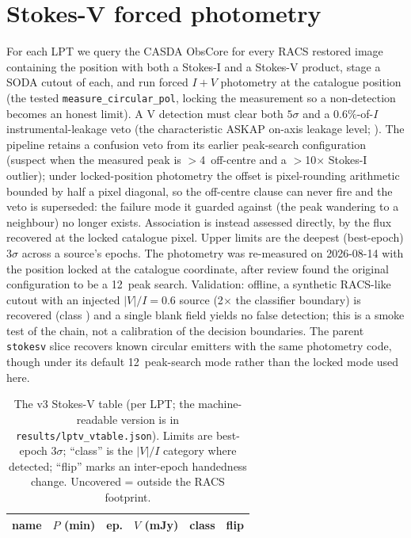 \documentclass[twocolumn]{aastex631}
\newcommand{\code}[1]{\texttt{#1}}
\begin{document}
\section{Stokes-V forced photometry}
\label{sec:v}
For each LPT we query the CASDA ObsCore for every RACS restored image containing the position with
both a Stokes-I and a Stokes-V product, stage a SODA cutout of each, and run forced $I{+}V$
photometry at the catalogue position (the tested \code{measure\_circular\_pol}, locking the
measurement so a non-detection becomes an honest limit). A V detection must clear both $5\sigma$
and a $0.6\%$-of-$I$ instrumental-leakage veto (the characteristic ASKAP on-axis leakage level;
\citealt{racslow2}). The pipeline retains a confusion veto from its earlier peak-search
configuration (suspect when the measured peak is $>$4\arcsec\ off-centre and a
$>$10$\times$ Stokes-I outlier); under locked-position photometry the offset is pixel-rounding
arithmetic bounded by half a pixel diagonal, so the off-centre clause can never fire and the veto
is superseded: the failure mode it guarded against (the peak wandering to a neighbour) no
longer exists. Association is instead assessed directly, by the flux recovered at the locked
catalogue pixel. Upper limits are the deepest (best-epoch) $3\sigma$ across a source's epochs.
The photometry was re-measured on 2026-08-14 with the position locked at the catalogue
coordinate, after review found the original configuration to be a 12\arcsec\ peak search.
Validation: offline, a synthetic RACS-like cutout with an injected $|V|/I = 0.6$ source
(2$\times$ the classifier boundary) is recovered (class \lvInjClass) and a single blank field
yields no false detection; this is a smoke test of the chain, not a calibration of the decision
boundaries. The parent \code{stokesv} slice recovers known circular emitters with the same
photometry code, though under its default 12\arcsec\ peak-search mode rather than the locked
mode used here.

\begin{table}
\centering
\caption{The v3 Stokes-V table (per LPT; the machine-readable version is in
\code{results/lptv\_vtable.json}). Limits are best-epoch $3\sigma$; ``class'' is the $|V|/I$ category where
detected; ``flip'' marks an inter-epoch handedness change. Uncovered = outside the RACS
footprint.}
\label{tab:vtable}
\footnotesize
\begin{tabular}{lrrlll}
\hline
name & $P$ (min) & ep. & $V$ (mJy) & class & flip \\
\hline

\end{tabular}
\end{table}
\end{document}
